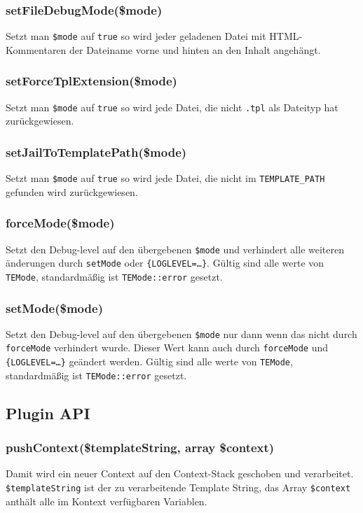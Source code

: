 \documentclass[a4paper,10pt]{article}
\begin{document}
\subsubsection{setFileDebugMode(\$mode)}
Setzt man {\tt \$mode} auf {\tt true} so wird jeder geladenen Datei mit HTML-Kommentaren
der Dateiname vorne und hinten an den Inhalt angeh\"angt.

\subsubsection{setForceTplExtension(\$mode)}
Setzt man {\tt \$mode} auf {\tt true} so wird jede Datei, die nicht {\tt .tpl} als Dateityp
 hat zur\"uckgewiesen.

\subsubsection{setJailToTemplatePath(\$mode)}
Setzt man {\tt \$mode} auf {\tt true} so wird jede Datei, die nicht im {\tt TEMPLATE\_PATH}
 gefunden wird zur\"uckgewiesen.

\subsubsection{forceMode(\$mode)}
Setzt den Debug-level auf den \"ubergebenen {\tt \$mode} und verhindert alle weiteren
 \"anderungen durch {\tt setMode} oder {\tt \{LOGLEVEL=\dots\}}. G\"ultig sind alle werte
von {\tt TEMode}, standardm\"a\ss{}ig ist {\tt TEMode::error} gesetzt.

\subsubsection{setMode(\$mode)}
Setzt den Debug-level auf den \"ubergebenen {\tt \$mode} nur dann wenn das nicht
 durch {\tt forceMode} verhindert wurde. Dieser Wert kann auch durch {\tt forceMode} und
 {\tt \{LOGLEVEL=\dots\}} ge\"andert werden.
G\"ultig sind alle werte von {\tt TEMode}, standardm\"a\ss{}ig ist {\tt TEMode::error} gesetzt.


\subsection{Plugin API}

\subsubsection{pushContext(\$templateString, array \$context)}
Damit wird ein neuer Context auf den Context-Stack geschoben und verarbeitet.
{\tt \$templateString} ist der zu verarbeitende Template String, das Array {\tt \$context} anth\"alt alle im Kontext verf\"ugbaren Variablen.
\end{document}
